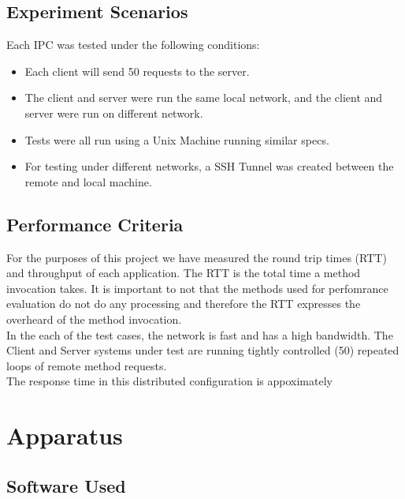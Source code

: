 \documentclass{article}
\begin{document}
\subsection{Experiment Scenarios}
Each IPC was tested under the following conditions:
\begin{itemize}
	\item Each client will send 50 requests to the server.
	\item The client and server were run the same local network, and the client and server were run
	on different network.
	\item Tests were all run using a Unix Machine running similar specs. 
	\item For testing under different networks, a SSH Tunnel was created between the remote and local machine.
\end{itemize}

\subsection{Performance Criteria}
For the purposes of this project we have measured the round trip times (RTT) and throughput of each application. The RTT is the total time a method invocation takes. It is important to not that the methods used for perfomrance evaluation do not do any processing and therefore the RTT expresses the overheard of the method invocation. \\

In the each of the test cases, the network is fast and has a high bandwidth. The Client and Server systems under test are running tightly controlled (50) repeated loops of remote method requests. \\

The response time in this distributed configuration is appoximately



 

\section{Apparatus}

\subsection{Software Used}
\end{document}
